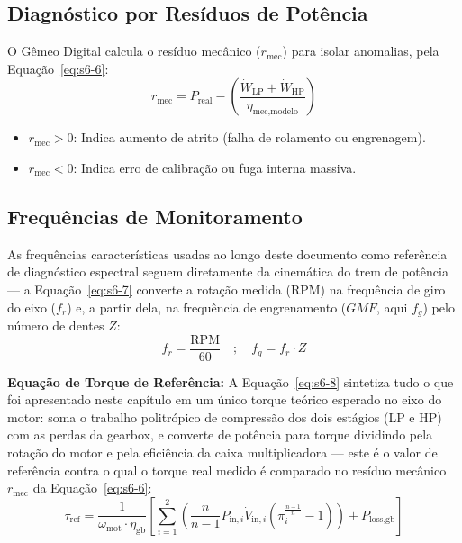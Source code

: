 \documentclass[12pt,a4paper]{article}
\numberwithin{equation}{section}
\numberwithin{table}{section}
\numberwithin{figure}{section}
\begin{document}
	\subsection{\textbf{Diagnóstico por Resíduos de Potência}}
	O Gêmeo Digital calcula o resíduo mecânico ($r_{\text{mec}}$) para isolar anomalias, pela Equação~\eqref{eq:s6-6}:
	\begin{equation}\label{eq:s6-6}
 r_{\text{mec}} = P_{\text{real}} - \left( \frac{\dot{W}_{\text{LP}} + \dot{W}_{\text{HP}}}{\eta_{\text{mec,modelo}}} \right) 
\end{equation}
	\begin{itemize}
		\item $r_{\text{mec}} > 0$: Indica aumento de atrito (falha de rolamento ou engrenagem).
		\item $r_{\text{mec}} < 0$: Indica erro de calibração ou fuga interna massiva.
	\end{itemize}
	
	\subsection{\textbf{Frequências de Monitoramento}}
	As frequências características usadas ao longo deste documento como referência de diagnóstico espectral seguem diretamente da cinemática do trem de potência — a Equação~\eqref{eq:s6-7} converte a rotação medida (RPM) na frequência de giro do eixo ($f_r$) e, a partir dela, na frequência de engrenamento ($GMF$, aqui $f_g$) pelo número de dentes $Z$:
	\begin{equation}\label{eq:s6-7}
 f_r = \frac{\text{RPM}}{60} \quad ; \quad f_g = f_r \cdot Z
\end{equation}

	\vspace{1em}
	\textbf{Equação de Torque de Referência:} A Equação~\eqref{eq:s6-8} sintetiza tudo o que foi apresentado neste capítulo em um único torque teórico esperado no eixo do motor: soma o trabalho politrópico de compressão dos dois estágios (LP e HP) com as perdas da gearbox, e converte de potência para torque dividindo pela rotação do motor e pela eficiência da caixa multiplicadora — este é o valor de referência contra o qual o torque real medido é comparado no resíduo mecânico $r_{\text{mec}}$ da Equação~\eqref{eq:s6-6}:
	\begin{equation}\label{eq:s6-8}
 \boxed{\tau_{\text{ref}} = \frac{1}{\omega_{\text{mot}} \cdot \eta_{\text{gb}}} \left[ \sum_{i=1}^{2} \left( \frac{n}{n-1} P_{\text{in},i} \dot{V}_{\text{in},i} \left( \pi_i^{\frac{n-1}{n}} - 1 \right) \right) + P_{\text{loss,gb}} \right]}
\end{equation}
\end{document}
